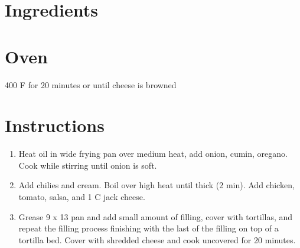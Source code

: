 \documentclass[ansiapaper,10pt,english]{sphinxmanual}
\begin{document}
\section{Ingredients}
\label{\detokenize{Chicken_EC:ingredients}}
%
\begin{sphinxVerbatim}[commandchars=\\\{\}]
  

  

  

  

   

   

   

  

    

   

    

  
\end{sphinxVerbatim}


\section{Oven}
\label{\detokenize{Chicken_EC:oven}}
400 F for 20 minutes or until cheese is browned


\section{Instructions}
\label{\detokenize{Chicken_EC:instructions}}\begin{enumerate}
\item {} 
Heat oil in wide frying pan over medium heat, add onion, cumin, oregano. Cook while stirring until onion is soft.

\item {} 
Add chilies and cream. Boil over high heat until thick (2 min). Add chicken, tomato, salsa, and 1 C jack cheese.

\item {} 
Grease 9 x 13 pan and add small amount of filling, cover with tortillas, and repeat the filling process finishing with the last of the filling on top of a tortilla bed.  Cover with shredded cheese and cook uncovered for 20 minutes.

\end{enumerate}
\end{document}

